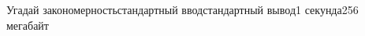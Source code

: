 \begin{problem}{Угадай закономерность}{стандартный ввод}{стандартный вывод}{1 секунда}{256 мегабайт}



\Examples

\begin{example}
%
%
%
%
%
\end{example}

\end{problem}

